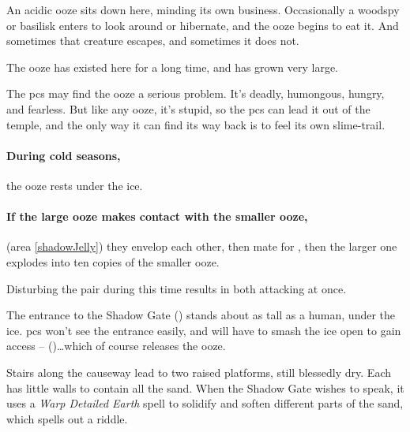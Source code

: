 
An acidic ooze sits down here, minding its own business.
Occasionally a woodspy or basilisk enters to look around or hibernate, and the ooze begins to eat it.
And sometimes that creature escapes, and sometimes it does not.

The ooze has existed here for a long time, and has grown very large.


The \glspl{pc} may find the ooze a serious problem.
It's deadly, humongous, hungry, and fearless.
But like any ooze, it's stupid, so the \glspl{pc} can lead it out of the temple, and the only way it can find its way back is to feel its own slime-trail.


\paragraph{During cold seasons,}
the ooze rests under the ice.

\paragraph{If the large ooze makes contact with the smaller ooze,}
(area \vref{shadowJelly})
they envelop each other, then mate for , then the larger one explodes into ten copies of the smaller ooze.

Disturbing the pair during this time results in  both attacking at once.


The entrance to the Shadow Gate () stands about as tall as a human, under the ice.
\Glspl{pc} won't see the entrance easily, and will have to smash the ice open to gain access --  (\tn[10])\ldots which of course releases the ooze.

Stairs along the causeway lead to two raised platforms, still blessedly dry.
Each has little walls to contain all the sand.
When the Shadow Gate wishes to speak, it uses a \textit{Warp Detailed Earth} spell to solidify and soften different parts of the sand, which spells out a riddle.


